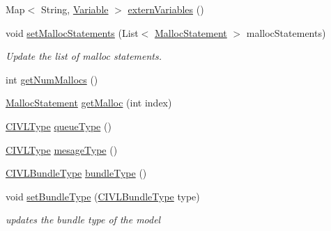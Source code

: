 \begin{DoxyCompactItemize}
\item 
Map$<$ String, \hyperlink{interfaceedu_1_1udel_1_1cis_1_1vsl_1_1civl_1_1model_1_1IF_1_1variable_1_1Variable}{Variable} $>$ \hyperlink{classedu_1_1udel_1_1cis_1_1vsl_1_1civl_1_1model_1_1common_1_1CommonModel_a75c53f5fb0c1aeb1820924206e840e61}{extern\+Variables} ()
\item 
void \hyperlink{classedu_1_1udel_1_1cis_1_1vsl_1_1civl_1_1model_1_1common_1_1CommonModel_a2a69771c9bc9f3e05a3c37afac9a4e91}{set\+Malloc\+Statements} (List$<$ \hyperlink{interfaceedu_1_1udel_1_1cis_1_1vsl_1_1civl_1_1model_1_1IF_1_1statement_1_1MallocStatement}{Malloc\+Statement} $>$ malloc\+Statements)
\begin{DoxyCompactList}\small\item\em Update the list of malloc statements. \end{DoxyCompactList}\item 
int \hyperlink{classedu_1_1udel_1_1cis_1_1vsl_1_1civl_1_1model_1_1common_1_1CommonModel_adbe1277657804ce58558b43ae3b41dbc}{get\+Num\+Mallocs} ()
\item 
\hyperlink{interfaceedu_1_1udel_1_1cis_1_1vsl_1_1civl_1_1model_1_1IF_1_1statement_1_1MallocStatement}{Malloc\+Statement} \hyperlink{classedu_1_1udel_1_1cis_1_1vsl_1_1civl_1_1model_1_1common_1_1CommonModel_a9af38be8b10e84d5d7b475026772ff7e}{get\+Malloc} (int index)
\item 
\hyperlink{interfaceedu_1_1udel_1_1cis_1_1vsl_1_1civl_1_1model_1_1IF_1_1type_1_1CIVLType}{C\+I\+V\+L\+Type} \hyperlink{classedu_1_1udel_1_1cis_1_1vsl_1_1civl_1_1model_1_1common_1_1CommonModel_af75d95c0c0abbe3fa32eab1c91fee709}{queue\+Type} ()
\item 
\hyperlink{interfaceedu_1_1udel_1_1cis_1_1vsl_1_1civl_1_1model_1_1IF_1_1type_1_1CIVLType}{C\+I\+V\+L\+Type} \hyperlink{classedu_1_1udel_1_1cis_1_1vsl_1_1civl_1_1model_1_1common_1_1CommonModel_a957b6d0c374877dbfc789b0a108138fb}{mesage\+Type} ()
\item 
\hyperlink{interfaceedu_1_1udel_1_1cis_1_1vsl_1_1civl_1_1model_1_1IF_1_1type_1_1CIVLBundleType}{C\+I\+V\+L\+Bundle\+Type} \hyperlink{classedu_1_1udel_1_1cis_1_1vsl_1_1civl_1_1model_1_1common_1_1CommonModel_a00c6a8c6681f66a36bc7328f8145ed1a}{bundle\+Type} ()
\item 
void \hyperlink{classedu_1_1udel_1_1cis_1_1vsl_1_1civl_1_1model_1_1common_1_1CommonModel_ad68ca90760c95e6aee8d408bbac933ee}{set\+Bundle\+Type} (\hyperlink{interfaceedu_1_1udel_1_1cis_1_1vsl_1_1civl_1_1model_1_1IF_1_1type_1_1CIVLBundleType}{C\+I\+V\+L\+Bundle\+Type} type)
\begin{DoxyCompactList}\small\item\em updates the bundle type of the model \end{DoxyCompactList}\item 

\end{DoxyCompactItemize}
